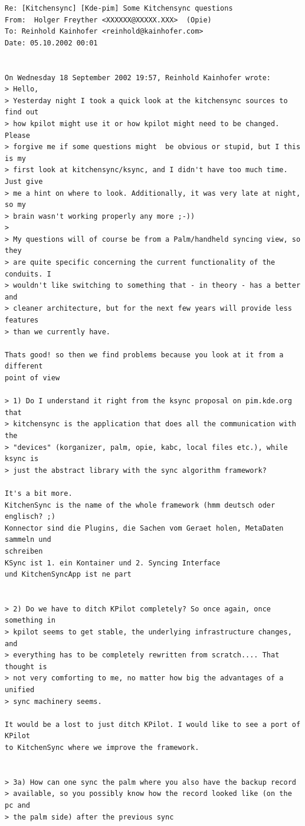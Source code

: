 \documentclass[10pt,a4paper]{article}
\begin{document}
{\footnotesize
\begin{verbatim}
Re: [Kitchensync] [Kde-pim] Some Kitchensync questions
From:  Holger Freyther <XXXXXX@XXXXX.XXX>  (Opie)
To: Reinhold Kainhofer <reinhold@kainhofer.com>
Date: 05.10.2002 00:01


On Wednesday 18 September 2002 19:57, Reinhold Kainhofer wrote:
> Hello,
> Yesterday night I took a quick look at the kitchensync sources to find out
> how kpilot might use it or how kpilot might need to be changed. Please
> forgive me if some questions might  be obvious or stupid, but I this is my
> first look at kitchensync/ksync, and I didn't have too much time. Just give
> me a hint on where to look. Additionally, it was very late at night, so my
> brain wasn't working properly any more ;-))
>
> My questions will of course be from a Palm/handheld syncing view, so they
> are quite specific concerning the current functionality of the conduits. I
> wouldn't like switching to something that - in theory - has a better and
> cleaner architecture, but for the next few years will provide less features
> than we currently have.

Thats good! so then we find problems because you look at it from a different 
point of view

> 1) Do I understand it right from the ksync proposal on pim.kde.org that
> kitchensync is the application that does all the communication with the
> "devices" (korganizer, palm, opie, kabc, local files etc.), while ksync is
> just the abstract library with the sync algorithm framework?

It's a bit more.
KitchenSync is the name of the whole framework (hmm deutsch oder englisch? ;)
Konnector sind die Plugins, die Sachen vom Geraet holen, MetaDaten sammeln und 
schreiben
KSync ist 1. ein Kontainer und 2. Syncing Interface
und KitchenSyncApp ist ne part


> 2) Do we have to ditch KPilot completely? So once again, once something in
> kpilot seems to get stable, the underlying infrastructure changes, and
> everything has to be completely rewritten from scratch.... That thought is
> not very comforting to me, no matter how big the advantages of a unified
> sync machinery seems.

It would be a lost to just ditch KPilot. I would like to see a port of KPilot 
to KitchenSync where we improve the framework.


> 3a) How can one sync the palm where you also have the backup record
> available, so you possibly know how the record looked like (on the pc and
> the palm side) after the previous sync


\end{verbatim}}
\end{document}
